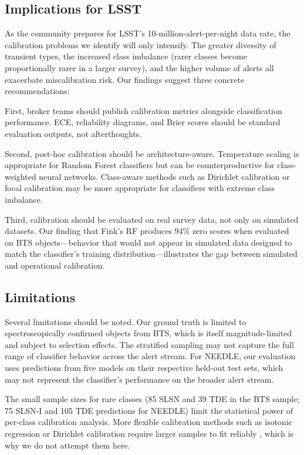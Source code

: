 \documentclass[twocolumn]{aastex631}
\begin{document}
\subsection{Implications for LSST}

As the community prepares for LSST's 10-million-alert-per-night data rate, the calibration problems we identify will only intensify. The greater diversity of transient types, the increased class imbalance (rarer classes become proportionally rarer in a larger survey), and the higher volume of alerts all exacerbate miscalibration risk. Our findings suggest three concrete recommendations:

First, broker teams should publish calibration metrics alongside classification performance. ECE, reliability diagrams, and Brier scores should be standard evaluation outputs, not afterthoughts.

Second, post-hoc calibration should be architecture-aware. Temperature scaling is appropriate for Random Forest classifiers but can be counterproductive for class-weighted neural networks. Class-aware methods such as Dirichlet calibration \citep{kull2019} or focal calibration \citep{mukhoti2020} may be more appropriate for classifiers with extreme class imbalance.

Third, calibration should be evaluated on real survey data, not only on simulated datasets. Our finding that Fink's RF produces 94\% zero scores when evaluated on BTS objects---behavior that would not appear in simulated data designed to match the classifier's training distribution---illustrates the gap between simulated and operational calibration.

\subsection{Limitations}

Several limitations should be noted. Our ground truth is limited to spectroscopically confirmed objects from BTS, which is itself magnitude-limited and subject to selection effects. The stratified sampling may not capture the full range of classifier behavior across the alert stream. For NEEDLE, our evaluation uses predictions from five models on their respective held-out test sets, which may not represent the classifier's performance on the broader alert stream.

The small sample sizes for rare classes (85 SLSN and 39 TDE in the BTS sample; 75 SLSN-I and 105 TDE predictions for NEEDLE) limit the statistical power of per-class calibration analysis. More flexible calibration methods such as isotonic regression or Dirichlet calibration require larger samples to fit reliably \citep{vaicenavicius2019}, which is why we do not attempt them here.
\end{document}
